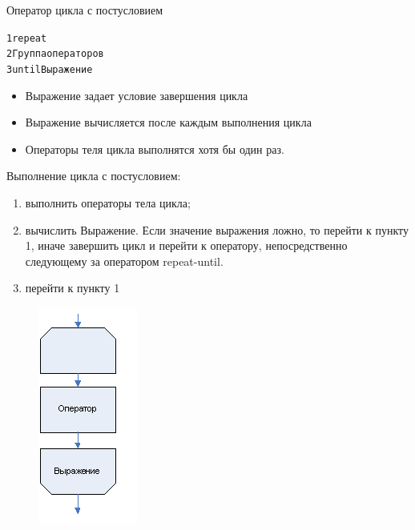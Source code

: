\documentclass{beamer}
\begin{document}
\begin{frame}[fragile]{Оператор цикла с постусловием}
\begin{alltt}
1 repeat
2   Группа операторов
3 until Выражение
\end{alltt}
\begin{itemize}
\item Выражение задает условие завершения цикла
\item Выражение вычисляется после каждым выполнения цикла
\item Операторы теля цикла выполнятся хотя бы один раз.
\end{itemize}
\begin{minipage}{0.6\textwidth}
\begin{flushleft}
Выполнение цикла с постусловием:
\begin{enumerate}
\item выполнить операторы тела цикла;
\item вычислить Выражение. Если значение выражения ложно, то перейти к пункту 1, иначе завершить цикл и перейти к оператору, непосредственно следующему за оператором repeat-until. 
\item перейти к пункту 1
\end{enumerate}
\end{flushleft}
\end{minipage}
\begin{minipage}{0.2\textwidth}
\begin{flushright}
\begin{figure}[h]
\includegraphics[scale=0.6]{images/lec04-pic09.png}
\end{figure}
\end{flushright}
\end{minipage}
\end{frame}
\end{document}
